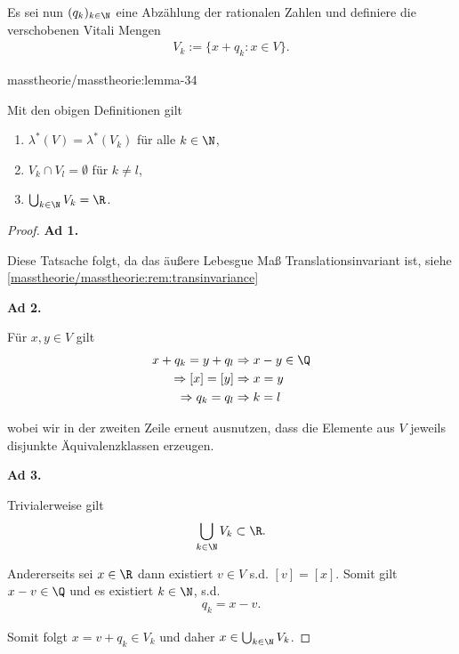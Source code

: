 \documentclass[letterpaper,10pt,german]{jupyterBook}
\begin{document}
\par
Es sei nun \((q_k)_{k\in\N}\) eine Abzählung der rationalen Zahlen und definiere die verschobenen Vitali Mengen
\begin{align*}
V_k :=\{x+q_k: x\in V\}.
\end{align*}\begin{lemma}{}{masstheorie/masstheorie:lemma-34}



\par
Mit den obigen Definitionen gilt
\begin{enumerate}

\item {} 
\par
\(\lambda^\ast(V) = \lambda^\ast(V_k)\) für alle \(k\in\N\),

\item {} 
\par
\(V_k\cap V_l=\emptyset\) für \(k\neq l\),

\item {} 
\par
\(\bigcup_{k\in\N} V_k = \R\).

\end{enumerate}
\end{lemma}

\begin{proof}
 

\par
\textbf{Ad 1.}

\par
Diese Tatsache folgt, da das äußere Lebesgue Maß Translationsinvariant ist, siehe \cref{masstheorie/masstheorie:rem:transinvariance} 

\par
\textbf{Ad 2.}

\par
Für \(x,y\in V\) gilt
\begin{align*}
x + q_k = y + q_l&\Rightarrow x-y\in\Q\\
\Rightarrow [x]=[y]&\Rightarrow x=y\\
\Rightarrow q_k=q_l&\Rightarrow k=l
\end{align*}
\par
wobei wir in der zweiten Zeile erneut ausnutzen, dass die Elemente aus \(V\) jeweils disjunkte Äquivalenzklassen erzeugen.

\par
\textbf{Ad 3.}

\par
Trivialerweise gilt
\begin{align*}
\bigcup_{k\in\N} V_k \subset \R.
\end{align*}
\par
Andererseits sei \(x\in\R\) dann existiert \(v\in V\) s.d. \([v] = [x]\). Somit gilt \(x-v\in\Q\) und es existiert \(k\in\N\), s.d.
\begin{align*}
q_k = x-v.
\end{align*}
\par
Somit folgt \(x=v+q_k\in V_k\) und daher \(x\in\bigcup_{k\in\N} V_k\).
\end{proof}
\end{document}
